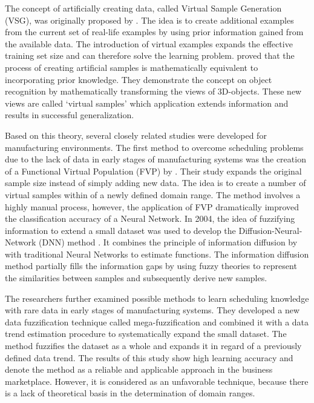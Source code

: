 \documentclass[parskip=full]{scrartcl}
\begin{document}
The concept of artificially creating data, called Virtual Sample Generation
(VSG), was originally proposed by \cite{Niyogi.1998}. The idea is to create
additional examples from the current set of real-life examples by using prior
information gained from the available data. The introduction of virtual examples
expands the effective training set size and can therefore solve the learning
problem. \cite{Niyogi.1998} proved that the process of creating artificial
samples is mathematically equivalent to incorporating prior knowledge. They
demonstrate the concept on object recognition by mathematically transforming the
views of 3D-objects. These new views are called ‘virtual samples’ which
application extends information and results in successful generalization. 

Based on this theory, several closely related studies were developed for
manufacturing environments. The first method to overcome scheduling problems due
to the lack of data in early stages of manufacturing systems was the creation of
a Functional Virtual Population (FVP) by \cite{Li.2003}.  Their study expands
the original sample size instead of simply adding new data. The idea is to
create a number of virtual samples within of a newly defined domain range. The
method involves a highly manual process, however, the application of FVP
dramatically improved the classification accuracy of a Neural Network. In 2004,
the idea of fuzzifying information to extend a small dataset was used to develop
the Diffusion-Neural-Network (DNN) method \cite{Huang.2004}. It combines the
principle of information diffusion by \cite{Huang.1997} with traditional Neural
Networks to estimate functions. The information diffusion method partially fills
the information gaps by using fuzzy theories to represent the similarities
between samples and subsequently derive new samples. 

The researchers \cite{Li.2006b} further examined possible methods to learn
scheduling knowledge with rare data in early stages of manufacturing systems.
They developed a new data fuzzification technique called mega-fuzzification and
combined it with a data trend estimation procedure to systematically expand the
small dataset. The method fuzzifies the dataset as a whole and expands it in
regard of a previously defined data trend. The results of this study show high
learning accuracy and denote the method as a reliable and applicable approach in
the business marketplace. However, it is considered as an unfavorable
technique, because there is a lack of theoretical basis in the determination of
domain ranges. 
\end{document}
